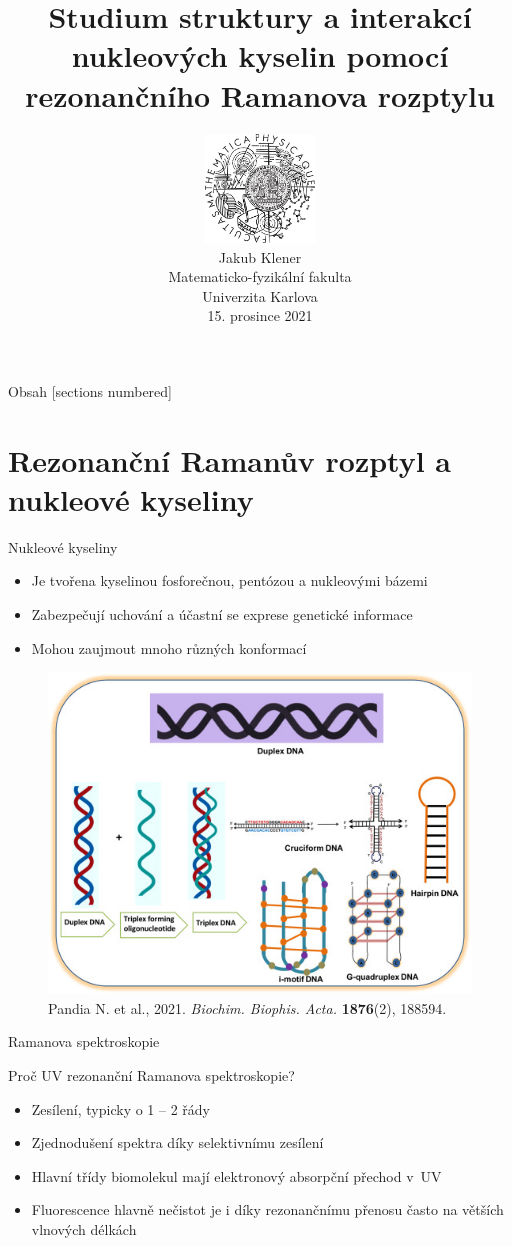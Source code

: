 \documentclass{beamer}
\title{Studium struktury a interakcí nukleových kyselin pomocí rezonančního
Ramanova rozptylu}
\date{}
\author{%
	\parbox[c]{0.25\textwidth}{%
		\includegraphics[width=0.22\textwidth]{assets/logo.pdf}%
	}%
	\parbox[c]{0.7\textwidth}{%
		Jakub Klener\\%
		Matematicko-fyzikální fakulta\\%
		Univerzita Karlova\\%
		15. prosince 2021
	}%
}
\begin{document}
\maketitle

\begin{frame}{Obsah}
  [sections numbered]
  \tableofcontents[hideallsubsections]
\end{frame}


\section{Rezonanční Ramanův rozptyl a nukleové kyseliny}

\begin{frame}{Nukleové kyseliny}
\begin{itemize}
	\item Je tvořena kyselinou fosforečnou, pentózou a nukleovými bázemi
	\item Zabezpečují uchování a účastní se exprese genetické informace
	\item Mohou zaujmout mnoho různých konformací
\end{itemize}

\begin{figure}
	\centering
	\includegraphics[width=.6\columnwidth]{assets/dna_conformations}
	\caption*{
		Pandia N. et al., 2021.
		\emph{Biochim. Biophis. Acta.}
		\textbf{1876}(2), 188594.
	}
\end{figure}
\end{frame}

\begin{frame}{Ramanova spektroskopie}
\begin{center}
	\resizebox{1\linewidth}{!}{}
\end{center}
\end{frame}

\begin{frame}{Proč UV rezonanční Ramanova spektroskopie?}
\begin{itemize}
	\item Zesílení, typicky o 1 -- 2 řády
	\item Zjednodušení spektra díky selektivnímu zesílení
	\item Hlavní třídy biomolekul mají elektronový absorpční přechod v~UV
	\item Fluorescence hlavně nečistot je i díky rezonančnímu přenosu často na
		větších vlnových délkách
\end{itemize}
\end{frame}
\end{document}
